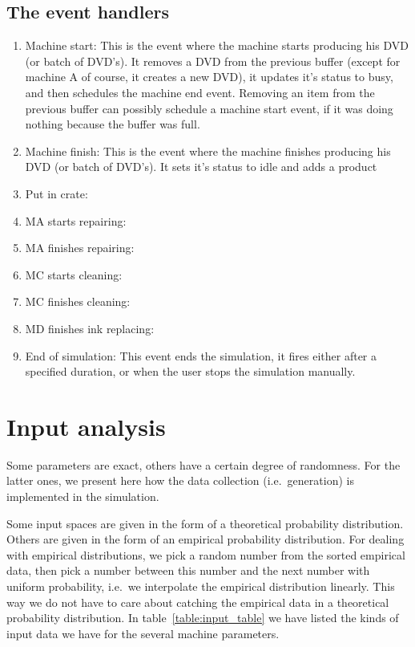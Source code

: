 \documentclass{article}
\begin{document}
\subsection{The event handlers}
\begin{enumerate}
    \item Machine start:
        This is the event where the machine starts producing his DVD (or batch of DVD's).
        It removes a DVD from the previous buffer (except for machine A of course, it creates a new DVD), it updates it's status to busy, and then schedules the machine end event.
        Removing an item from the previous buffer can possibly schedule a machine start event, if it was doing nothing because the buffer was full.
    \item Machine finish:
        This is the event where the machine finishes producing his DVD (or batch of DVD's).
        It sets it's status to idle and adds a product

    \item Put in crate:

    \item MA starts repairing:
    \item MA finishes repairing:
    \item MC starts cleaning:
    \item MC finishes cleaning:
    \item MD finishes ink replacing:

    \item End of simulation:
        This event ends the simulation, it fires either after a specified duration, or when the user stops the simulation manually.
        
\end{enumerate}


\section{Input analysis}
Some parameters are exact, others have a certain degree of randomness.
For the latter ones, we present here how the data collection (i.e.\ generation) is implemented in the simulation.

Some input spaces are given in the form of a theoretical probability distribution.
Others are given in the form of an empirical probability distribution.
For dealing with empirical distributions, we pick a random number from the sorted empirical data, then pick a number between this number and the next number with uniform probability, i.e.\ we interpolate the empirical distribution linearly.
This way we do not have to care about catching the empirical data in a theoretical probability distribution.
In table~\ref{table:input_table} we have listed the kinds of input data we have for the several machine parameters.
\end{document}
